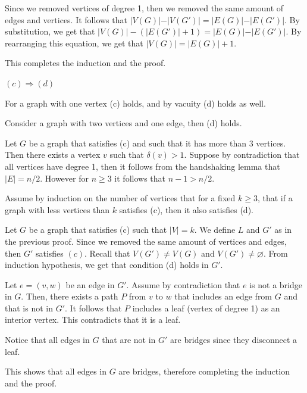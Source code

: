 \begin{enumerate}
        Since we removed vertices of degree 1, then we removed the same amount of edges and vertices. It follows that $\vert V (G) \vert - \vert V(G') \vert = \vert E(G) \vert - \vert E(G') \vert$. By substitution, we get that $ \vert V (G) \vert - (\vert E(G') \vert +1) = \vert E(G) \vert - \vert E(G') \vert$. By rearranging this equation, we get that $\vert V(G) \vert = \vert E(G)\vert +1$.
        
        This completes the induction and the proof.
        
        \vspace{1em}
        
        \underline{$(c) \Rightarrow (d)$}
        
        For a graph with one vertex (c) holds, and by vacuity (d) holds as well.
        
        Consider a graph with two vertices and one edge, then (d) holds.
        
        Let $G$ be a graph that satisfies (c) and such that it has more than 3 vertices. Then there exists a vertex $v$ such that $\delta(v) > 1$. Suppose by contradiction that all vertices have degree 1, then it follows from the handshaking lemma that $\vert E \vert = n/2$. However for $n \geq 3$ it follows that $n-1 > n/2$.
        
        Assume by induction on the number of vertices that for a fixed $k\geq 3$, that if a graph with less vertices than $k$ satisfies (c), then it also satisfies (d).
        
        Let $G$ be a graph that satisfies (c) such that $\vert V \vert = k$. We define $L$ and $G'$ as in the previous proof. Since we removed the same amount of vertices and edges, then $G'$ satisfies $(c)$. Recall that $V(G') \neq V(G)$ and $V(G') \neq \varnothing$. From induction hypothesis, we get that condition (d) holds in $G'$.
        
        Let $e = (v,w)$ be an edge in $G'$. Assume by contradiction that $e$ is not a bridge in $G$. Then, there exists a path $P$ from $v$ to $w$ that includes an edge from $G$ and that is not in $G'$. It follows that $P$ includes a leaf (vertex of degree 1) as an interior vertex. This contradicts that it is a leaf.
        
        Notice that all edges in $G$ that are not in $G'$ are bridges since they disconnect a leaf. 
        
        This shows that all edges in $G$ are bridges, therefore completing the induction and the proof.
        

\end{enumerate}

